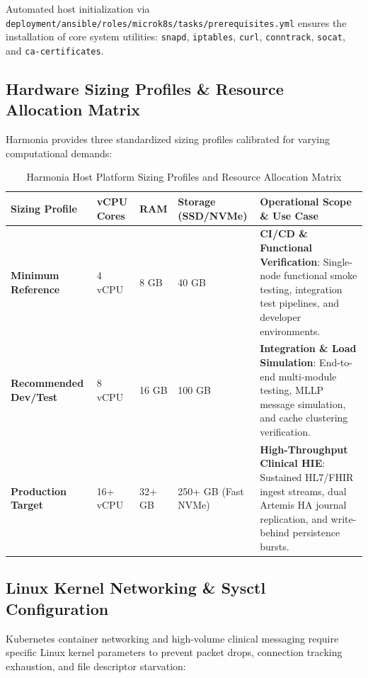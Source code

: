 Automated host initialization via \texttt{deployment/ansible/roles/microk8s/tasks/prerequisites.yml} ensures the installation of core system utilities: \texttt{snapd}, \texttt{iptables}, \texttt{curl}, \texttt{conntrack}, \texttt{socat}, and \texttt{ca-certificates}.

\subsection{Hardware Sizing Profiles \& Resource Allocation Matrix}

Harmonia provides three standardized sizing profiles calibrated for varying computational demands:

\begin{table}[htbp]
\centering
\small
\begin{tabularx}{\textwidth}{l C{2.0cm} C{2.2cm} C{2.6cm} X}
\toprule
\textbf{Sizing Profile} & \textbf{vCPU Cores} & \textbf{RAM} & \textbf{Storage (SSD/NVMe)} & \textbf{Operational Scope \& Use Case} \\
\midrule
\textbf{Minimum Reference} & 4 vCPU & 8 GB & 40 GB & \textbf{CI/CD \& Functional Verification}: Single-node functional smoke testing, integration test pipelines, and developer environments. \\
\addlinespace
\textbf{Recommended Dev/Test} & 8 vCPU & 16 GB & 100 GB & \textbf{Integration \& Load Simulation}: End-to-end multi-module testing, MLLP message simulation, and cache clustering verification. \\
\addlinespace
\textbf{Production Target} & 16+ vCPU & 32+ GB & 250+ GB (Fast NVMe) & \textbf{High-Throughput Clinical HIE}: Sustained HL7/FHIR ingest streams, dual Artemis HA journal replication, and write-behind persistence bursts. \\
\bottomrule
\end{tabularx}
\caption{Harmonia Host Platform Sizing Profiles and Resource Allocation Matrix}
\label{tab:hardware_sizing}
\end{table}

\subsection{Linux Kernel Networking \& Sysctl Configuration}

Kubernetes container networking and high-volume clinical messaging require specific Linux kernel parameters to prevent packet drops, connection tracking exhaustion, and file descriptor starvation:

